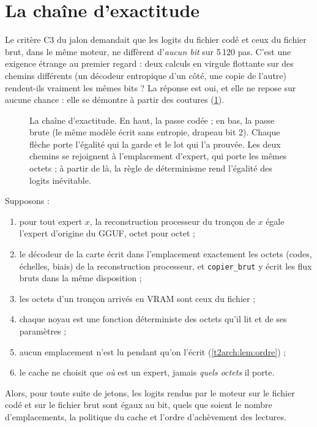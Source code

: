 \section{La chaîne d'exactitude}\label{t2arch:sec:chaine}

Le critère C3 du jalon demandait que les logits du fichier codé et ceux du fichier brut, dans le même moteur, ne diffèrent d'\emph{aucun bit} sur 5\,120 pas. C'est une exigence étrange au premier regard : deux calculs en virgule flottante sur des chemins différents (un décodeur entropique d'un côté, une copie de l'autre) rendent-ils vraiment les mêmes bits ? La réponse est oui, et elle ne repose sur aucune chance : elle se démontre à partir des coutures (\cref{t2arch:fig:chaine}).

\begin{figure}[ht]
\centering
\TdArchChaine
\caption[La chaîne d'exactitude]{La chaîne d'exactitude. En haut, la passe codée ; en bas, la passe brute (le même modèle écrit sans entropie, drapeau bit 2). Chaque flèche porte l'égalité qui la garde et le lot qui l'a prouvée. Les deux chemins se rejoignent à l'emplacement d'expert, qui porte les mêmes octets ; à partir de là, la règle de déterminisme rend l'égalité des logits inévitable.}
\label{t2arch:fig:chaine}
\end{figure}

\begin{theoreme}\label{t2arch:thm:chaine}
Supposons :
\begin{enumerate}
\item[(C1)] pour tout expert $x$, la reconstruction processeur du tronçon de $x$ égale l'expert d'origine du GGUF, octet pour octet ;
\item[(K1)] le décodeur de la carte écrit dans l'emplacement exactement les octets (codes, échelles, biais) de la reconstruction processeur, et \texttt{copier\_brut} y écrit les flux bruts dans la même disposition ;
\item[(C2)] les octets d'un tronçon arrivés en VRAM sont ceux du fichier ;
\item[(N)] chaque noyau est une fonction déterministe des octets qu'il lit et de ses paramètres ;
\item[(L)] aucun emplacement n'est lu pendant qu'on l'écrit (\cref{t2arch:lem:ordre}) ;
\item[(A)] le cache ne choisit que \emph{où} est un expert, jamais \emph{quels octets} il porte.
\end{enumerate}
Alors, pour toute suite de jetons, les logits rendus par le moteur sur le fichier codé et sur le fichier brut sont égaux au bit, quels que soient le nombre d'emplacements, la politique du cache et l'ordre d'achèvement des lectures.
\end{theoreme}

